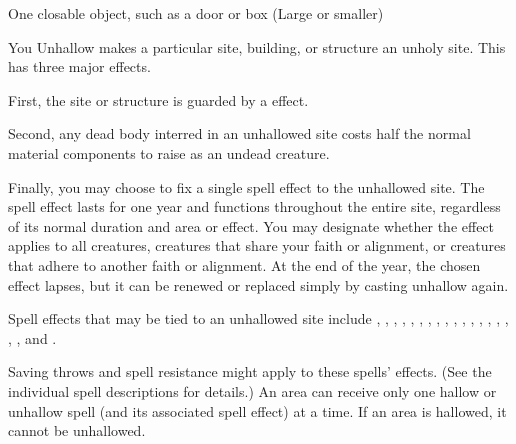 \begin{spelltarget}{One closable object, such as a door or box (Large or smaller)}
\begin{spelltarget}{You}
\spelleffect Unhallow makes a particular site, building, or structure an unholy site. This has three major effects.
\par First, the site or structure is guarded by a  effect.
\par Second, any dead body interred in an unhallowed site costs half the normal material components to raise as an undead creature.
\par Finally, you may choose to fix a single spell effect to the unhallowed site. The spell effect lasts for one year and functions throughout the entire site, regardless of its normal duration and area or effect. You may designate whether the effect applies to all creatures, creatures that share your faith or alignment, or creatures that adhere to another faith or alignment. At the end of the year, the chosen effect lapses, but it can be renewed or replaced simply by casting unhallow again.
\par Spell effects that may be tied to an unhallowed site include , , , , , , , , , , , , , , , , , , and .
\par Saving throws and spell resistance might apply to these spells' effects. (See the individual spell descriptions for details.)
\spellnotes An area can receive only one hallow or unhallow spell (and its associated spell effect) at a time. If an area is hallowed, it cannot be unhallowed.


\end{spelltarget}
\end{spelltarget}
